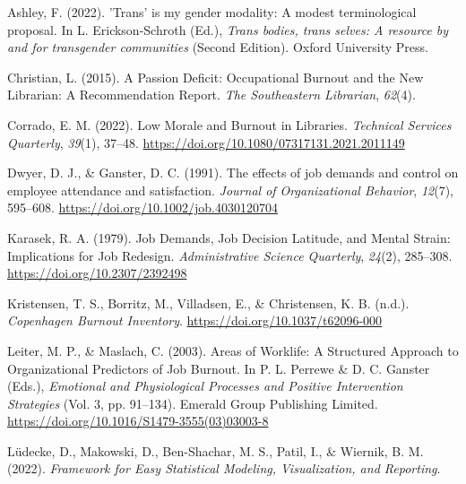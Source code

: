 \documentclass[
  twocolumn]{article}
\newlength{\cslhangindent}
\newenvironment{CSLReferences}[2] %
 {\begin{list}{}{%
  \setlength{\itemindent}{0pt}
  \setlength{\leftmargin}{0pt}
  \setlength{\parsep}{0pt}
  \ifodd #1
   \setlength{\leftmargin}{\cslhangindent}
   \setlength{\itemindent}{-1\cslhangindent}
  \fi
  \setlength{\itemsep}{#2\baselineskip}}}
 {\end{list}}
\begin{document}
\label{refs}
\begin{CSLReferences}{1}{0}
Ashley, F. (2022). '{Trans}' is my gender modality: {A} modest
terminological proposal. In L. Erickson-Schroth (Ed.), \emph{Trans
bodies, trans selves: {A} resource by and for transgender communities}
(Second Edition). Oxford University Press.

Christian, L. (2015). A {Passion Deficit}: {Occupational Burnout} and
the {New Librarian}: {A Recommendation Report}. \emph{The Southeastern
Librarian}, \emph{62}(4).

Corrado, E. M. (2022). Low {Morale} and {Burnout} in {Libraries}.
\emph{Technical Services Quarterly}, \emph{39}(1), 37--48.
\url{https://doi.org/10.1080/07317131.2021.2011149}

Dwyer, D. J., \& Ganster, D. C. (1991). The effects of job demands and
control on employee attendance and satisfaction. \emph{Journal of
Organizational Behavior}, \emph{12}(7), 595--608.
\url{https://doi.org/10.1002/job.4030120704}

Karasek, R. A. (1979). Job {Demands}, {Job Decision Latitude}, and
{Mental Strain}: {Implications} for {Job Redesign}. \emph{Administrative
Science Quarterly}, \emph{24}(2), 285--308.
\url{https://doi.org/10.2307/2392498}

Kristensen, T. S., Borritz, M., Villadsen, E., \& Christensen, K. B.
(n.d.). \emph{Copenhagen {Burnout Inventory}}.
\url{https://doi.org/10.1037/t62096-000}

Leiter, M. P., \& Maslach, C. (2003). Areas of {Worklife}: {A Structured
Approach} to {Organizational Predictors} of {Job Burnout}. In P. L.
Perrewe \& D. C. Ganster (Eds.), \emph{Emotional and {Physiological
Processes} and {Positive Intervention Strategies}} (Vol. 3, pp.
91--134). Emerald Group Publishing Limited.
\url{https://doi.org/10.1016/S1479-3555(03)03003-8}

Lüdecke, D., Makowski, D., Ben-Shachar, M. S., Patil, I., \& Wiernik, B.
M. (2022). \emph{Framework for {Easy Statistical Modeling},
{Visualization}, and {Reporting}}.


\end{CSLReferences}
\end{document}
